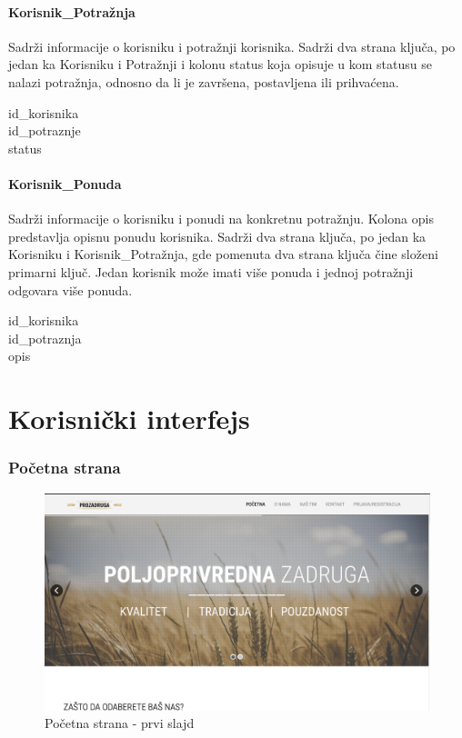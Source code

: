 \documentclass[a4paper, oneside]{article}
\begin{document}
\paragraph{Korisnik\_Potražnja} Sadrži informacije o korisniku i potražnji korisnika. Sadrži dva strana ključa, po jedan ka Korisniku i Potražnji i kolonu status koja opisuje u kom statusu se nalazi potražnja, odnosno da li je završena, postavljena ili prihvaćena. 
\begin{description}
    \item[id\_korisnika]
    \item[id\_potraznje]
    \item[status]
\end{description}
\paragraph{Korisnik\_Ponuda} Sadrži informacije o korisniku i ponudi na konkretnu potražnju. Kolona opis predstavlja opisnu ponudu korisnika. Sadrži dva strana ključa, po jedan ka Korisniku i Korisnik\_Potražnja, gde pomenuta dva strana ključa čine složeni primarni ključ. Jedan korisnik može imati više ponuda i jednoj potražnji odgovara više ponuda.  
\begin{description}
    \item[id\_korisnika]
    \item[id\_potraznja]
    \item[opis]
\end{description}
\section{Korisnički interfejs}
\label{korisnicki_interfejs}

\subsubsection{Početna strana}
\begin{figure}[h!]
    \centering
    \includegraphics[scale=0.3]{images/home1.png}
    \caption{Početna strana - prvi slajd}
    \label{homepage1}
\end{figure}
\end{document}
